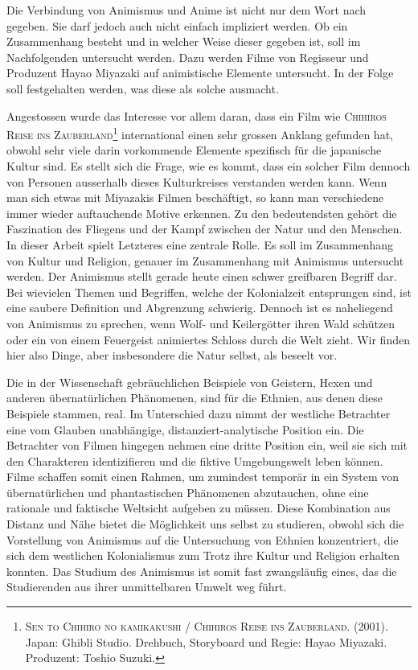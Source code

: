 
Die Verbindung von Animismus und Anime ist nicht nur dem Wort nach gegeben. Sie darf jedoch auch nicht einfach impliziert werden. Ob ein Zusammenhang besteht und in welcher Weise dieser gegeben ist, soll im Nachfolgenden untersucht werden. Dazu werden Filme von Regisseur und Produzent Hayao Miyazaki auf animistische Elemente untersucht. In der Folge soll festgehalten werden, was diese als solche ausmacht.

Angestossen wurde das Interesse vor allem daran, dass ein Film wie \textsc{Chihiros Reise ins Zauberland}\footnote{\textsc{Sen to Chihiro no kamikakushi / Chihiros Reise ins Zauberland}. (2001). Japan: Ghibli Studio. Drehbuch, Storyboard und Regie: Hayao Miyazaki. Produzent: Toshio Suzuki.} international einen sehr grossen Anklang gefunden hat, obwohl sehr viele darin vorkommende Elemente spezifisch für die japanische Kultur sind. Es stellt sich die Frage, wie es kommt, dass ein solcher Film dennoch von Personen ausserhalb dieses Kulturkreises verstanden werden kann. Wenn man sich etwas mit Miyazakis Filmen beschäftigt, so kann man verschiedene immer wieder auftauchende Motive erkennen. Zu den bedeutendsten gehört die Faszination des Fliegens und der Kampf zwischen der Natur und den Menschen. In dieser Arbeit spielt Letzteres eine zentrale Rolle. Es soll im Zusammenhang von Kultur und Religion, genauer im Zusammenhang mit Animismus untersucht werden. Der Animismus stellt gerade heute einen schwer greifbaren Begriff dar. Bei wievielen Themen und Begriffen, welche der Kolonialzeit entsprungen sind, ist eine saubere Definition und Abgrenzung schwierig. Dennoch ist es naheliegend von Animismus zu sprechen, wenn Wolf- und Keilergötter ihren Wald schützen oder ein von einem Feuergeist animiertes Schloss durch die Welt zieht. Wir finden hier also Dinge, aber insbesondere die Natur selbst, als beseelt vor. 

Die in der Wissenschaft gebräuchlichen Beispiele von Geistern, Hexen und anderen übernatürlichen Phänomenen, sind für die Ethnien, aus denen diese Beispiele stammen, real. Im Unterschied dazu nimmt der westliche Betrachter eine vom Glauben unabhängige, distanziert-analytische Position ein. Die Betrachter von Filmen hingegen nehmen eine dritte Position ein, weil sie sich mit den Charakteren identizifieren und die fiktive Umgebungswelt leben können. Filme schaffen somit einen Rahmen, um zumindest temporär in ein System von übernatürlichen und phantastischen Phänomenen abzutauchen, ohne eine rationale und faktische Weltsicht aufgeben zu müssen. Diese Kombination aus Distanz und Nähe bietet die Möglichkeit uns selbst zu studieren, obwohl sich die Vorstellung von Animismus auf die Untersuchung von Ethnien konzentriert, die sich dem westlichen Kolonialismus zum Trotz ihre Kultur und Religion erhalten konnten. Das Studium des Animismus ist somit fast zwangsläufig eines, das die Studierenden aus ihrer unmittelbaren Umwelt weg führt. 


